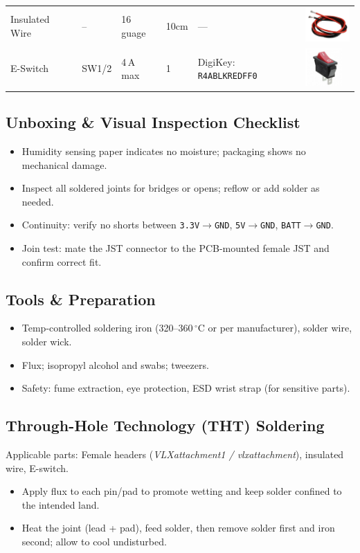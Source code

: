 \begin{longtable}{@{}m{2.2cm}m{2cm}m{2cm}m{1.5cm}m{4.5cm}m{2.5cm}@{}}
Insulated Wire & -- & 16\,guage & 10cm & --- & \includegraphics[width=1.8cm]{img/manual/item6.png}\\
E-Switch & SW1/2 & 4\,A max & 1 & DigiKey: \texttt{R4ABLKREDFF0} & \includegraphics[width=1.4cm]{img/manual/item7.png}\\
\bottomrule
\end{longtable}

\pagebreak
\subsection*{Unboxing \& Visual Inspection Checklist}
\begin{itemize}
  \item[] \checkbox{} Humidity sensing paper indicates no moisture; packaging shows no mechanical damage.
  \item[] \checkbox{} Inspect all soldered joints for bridges or opens; reflow or add solder as needed.
  \item[] \checkbox{} Continuity: verify no shorts between \texttt{3.3V$\rightarrow$GND}, \texttt{5V$\rightarrow$GND}, \texttt{BATT$\rightarrow$GND}.
  \item[] \checkbox{} Join test: mate the JST connector to the PCB-mounted female JST and confirm correct fit.
\end{itemize}

\subsection*{Tools \& Preparation}
\begin{itemize}
  \item Temp-controlled soldering iron (320--360\,$^{\circ}$C or per manufacturer), solder wire, solder wick.
  \item Flux; isopropyl alcohol and swabs; tweezers.
  \item Safety: fume extraction, eye protection, ESD wrist strap (for sensitive parts).
\end{itemize}

\subsection*{Through-Hole Technology (THT) Soldering}
Applicable parts: Female headers (\textit{VLXattachment1 / vlxattachment}), insulated wire, E-switch.
\begin{itemize}
  \item Apply flux to each pin/pad to promote wetting and keep solder confined to the intended land.
  \item Heat the joint (lead + pad), feed solder, then remove solder first and iron second; allow to cool undisturbed.
\end{itemize}

